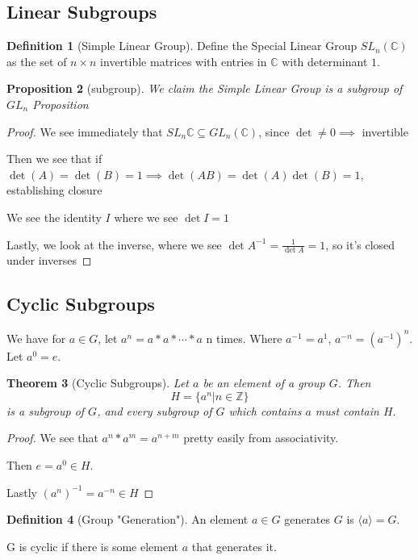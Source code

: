 \documentclass[11pt]{article}
\newcommand{\1}{\mathbf{1}}
\theoremstyle{notestyle}
\newtheorem{theorem}{Theorem}[section]
\newtheorem{proposition}[theorem]{Proposition}
\theoremstyle{definition}
\newtheorem{definition}[theorem]{Definition}
\begin{document}
\subsection{Linear Subgroups}
\begin{definition}[Simple Linear Group]
\label{def:special-linear-group}
Define the Special Linear Group $SL_n(\mathbb{C})$ as the set of $n \times n$ invertible
matrices with entries in $\mathbb{C}$ with determinant $1$.
\end{definition}
\newpage
\begin{proposition}[subgroup]
    \label{def:label}
    We claim the Simple Linear Group is a subgroup of $GL_n$
Proposition
\end{proposition}
\begin{proof}
    We see immediately that $SL_n{\mathbb{C}}\subseteq GL_n(\mathbb{C})$, since $\det
    \ne 0\implies$ invertible
    \par Then we see that if $\det(A) = \det(B) = 1 \implies \det(AB) = \det(A)
    \det(B) = 1$, establishing closure
    \par We see the identity $I$ where we see $\det I =1$
    \par Lastly, we look at the inverse, where we see $\det{A^{-1}}=\frac{1}{\det A} =
    1$, so it's closed under inverses
\end{proof}
\subsection{Cyclic Subgroups}
We have for $a \in G$, let $a^n = a * a * \cdots * a$ n times. Where $a^{-1} = a^{1}$,
$a^{-n} = (a^{-1})^{n}.$ Let $a^{0} = e.$
\begin{theorem}[Cyclic Subgroups]
\label{thm:label}
Let $a$ be an element  of a group $G$. Then $$H = \{a^n | n \in \mathbb{Z}\}$$ is a
subgroup  of $G$, and every subgroup of $G$ which contains $a$ must contain $H.$
\end{theorem}
\begin{proof}
    We see that $a^{n} * a^{m} = a^{n + m}$ pretty easily from associativity.
    \par Then $e = a^{0} \in H.$
    \par Lastly $(a^n)^{-1} = a^{-n} \in H$
\end{proof}
\begin{definition}[Group "Generation"]
\label{def:label}
An element $a \in G$ generates $G$ is $\langle a\rangle  = G.$\par  G is cyclic if there is
some element $a$ that generates it.
\end{definition}
\end{document}
